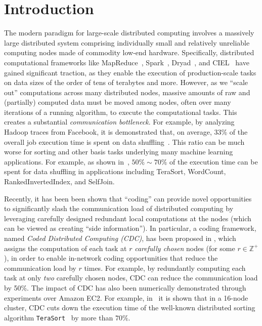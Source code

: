 \documentclass[conference]{IEEEtran}
\begin{document}
\allowdisplaybreaks


\section{Introduction}\label{sec:intro}


The modern paradigm for large-scale distributed computing involves a massively large distributed system comprising individually small and relatively unreliable computing nodes made of commodity low-end hardware.  Specifically, distributed computational frameworks like MapReduce~\cite{dean2004mapreduce}, Spark~\cite{spark}, Dryad~\cite{Dryad}, and CIEL~\cite{Ciel} have gained significant traction, as they enable the execution of production-scale tasks on data sizes of the order of tens of terabytes and more. However, as we ``scale out'' computations across many distributed nodes, massive amounts of raw and (partially) computed data must be moved among nodes, often over many iterations of a running algorithm, to execute the computational tasks. This creates a substantial \emph{communication bottleneck}. For example, by analyzing Hadoop traces from Facebook, it is demonstrated that, on average, 33\% of the overall job execution time is spent on data shuffling~\cite{chowdhury2011managing}. This ratio can be much worse for sorting and other basis tasks underlying many machine learning applications. For example, as shown in~\cite{zhang2013performance}, $50\%\sim70\%$ of the execution time can be spent for data shuffling in applications including TeraSort, WordCount, RankedInvertedIndex, and SelfJoin.

Recently, it has been been shown that ``coding'' can provide novel opportunities to significantly slash the communication load of distributed computing by leveraging carefully designed redundant local computations at the nodes (which can be viewed as creating ``side information''). In particular, a coding framework, named \emph{Coded Distributed Computing (CDC)}, has been proposed in \cite{LMA_all,Avestimehr_CDC,li2016fundamental}
, which assigns the computation of each task at $r$ \emph{carefully chosen} nodes (for some $r \in \mathbb{Z}^+$), in order to enable in-network coding opportunities  that reduce the communication load by  $r$ times. For example, by redundantly computing each task at only \emph{two} carefully chosen nodes, CDC can reduce the communication load by 50\%. The impact of CDC has also been numerically demonstrated  through experiments over Amazon EC2. For example, in~\cite{CTS16} it is shown that in a 16-node cluster, CDC cuts down the execution time of the well-known distributed sorting algorithm \texttt{TeraSort}~\cite{o2008terabyte} by more than $70\%$.
\end{document}
